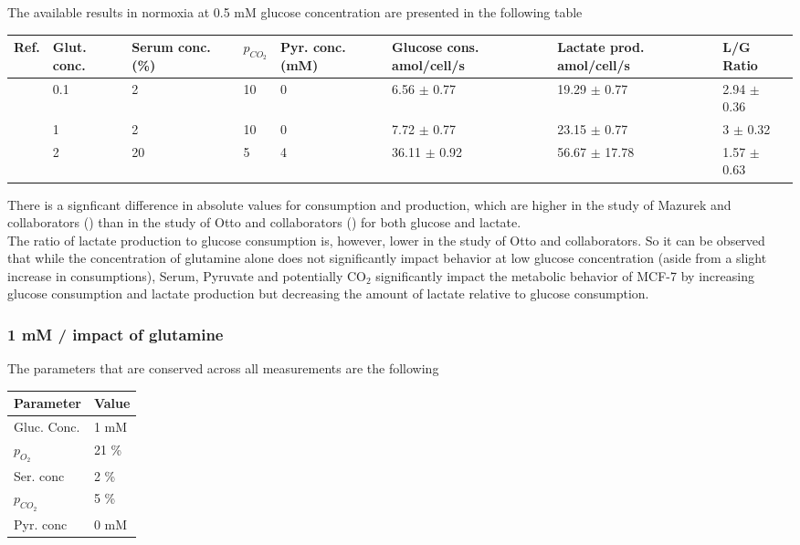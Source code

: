 \documentclass[11pt,a4paper]{article}
\begin{document}
The available results in normoxia at 0.5 mM glucose concentration are presented in the following table 
\begin{table}[h!]
\begin{center}
\begin{tabular}{ |p{7mm}|p{12mm}|p{12mm}|p{10mm}|p{10mm}|p{21mm}|p{23mm}|p{25mm}| }
 \hline
 \textbf{Ref.} & \textbf{Glut. conc.} & \textbf{Serum conc.} (\%) & $p_{CO_2}$ & \textbf{Pyr. conc.} (mM) & \textbf{Glucose cons.} amol/cell/s& \textbf{Lactate prod.} amol/cell/s& \textbf{L/G Ratio} \\
 \hline
   \cite{Otto2015} & 0.1 & 2 & 10 & 0  &   6.56 $\pm$  0.77  &19.29  $\pm$  0.77  & 2.94  $\pm$ 0.36  \\
    \hline
   \cite{Otto2015} & 1 & 2 & 10 & 0 &   7.72 $\pm$  0.77  & 23.15 $\pm$  0.77& 3 $\pm$  0.32 \\
   \hline
  \cite{Mazurek1997} & 2 & 20 & 5 & 4 &   36.11  $\pm$ 0.92 &  56.67 $\pm$  17.78   & 1.57 $\pm$  0.63 \\
   \hline

\end{tabular}
\end{center}
\end{table}

There is a signficant difference in absolute values for consumption and production, which are higher in the study of Mazurek and collaborators (\cite{Mazurek1997}) than in the study of Otto and collaborators (\cite{Otto2015}) for both glucose and lactate.\\

The ratio of lactate production to glucose consumption is, however, lower in the study of Otto and collaborators. So it can be observed that while the concentration of glutamine alone does not significantly impact behavior at low glucose concentration (aside from a slight increase in consumptions), Serum, Pyruvate and potentially CO$_2$ significantly impact the metabolic behavior of MCF-7 by increasing glucose consumption and lactate production but decreasing the amount of lactate relative to glucose consumption.

\subsubsection{1 mM / impact of glutamine}
The parameters that are conserved across all measurements are the following\\ 

\begin{table}[h!]
\begin{center}
\begin{tabular}{ |p{25mm}|p{25mm}|}
\hline
\textbf{Parameter} & \textbf{Value} \\
\hline
Gluc. Conc. & 1 mM \\
\hline
$p_{O_2}$ & 21 \% \\
\hline
Ser. conc & 2 \% \\
\hline
$p_{CO_2}$ & 5 \% \\
\hline
Pyr. conc & 0 mM \\
\hline
\end{tabular}
\end{center}
\end{table}
\end{document}
